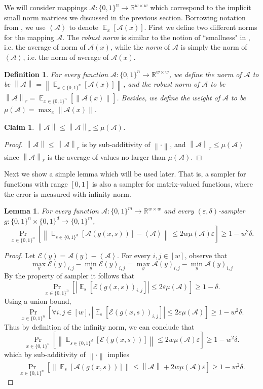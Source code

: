 \documentclass[10pt,a4paper]{article}
\newtheorem{definition}[theorem]{Definition}
\newtheorem{lemma}[theorem]{Lemma}
\newtheorem{claim}[theorem]{Claim}
\DeclareMathOperator*{\Ex}{\mathbb E}
\newcommand{\ex}[2][]{\Ex_{#1}\left[#2\right]}
\newcommand{\pr}[2][]{\Pr_{#1}\left[#2\right]}
\newcommand{\abs}[1]{\left|#1\right|}
\newcommand{\inp}[1]{\left\langle#1\right\rangle}
\newcommand{\norm}[2][]{\left\|#2\right\|_{#1}}
\newcommand{\bbR}{\mathbb R}
\newcommand{\cA}{\mathcal A}
\newcommand{\cE}{\mathcal E}
\newcommand{\bits}[1]{\{0,1\}^{#1}}
\newcommand{\eps}{\varepsilon}
\newcommand{\wt}{\mu}
\newcommand{\ninf}{\norm}
\begin{document}
We will consider mappings $\cA:\bits{n}\to\bbR^{w\times w}$ which correspond to the implicit small norm matrices we discussed in the previous section. Borrowing notation from , we use $\inp{\cA}$ to denote $\ex[x]{\cA(x)}$. First we define two different norms for the mapping $\cA$. The \emph{robust norm} is similar to the notion of ``smallness" in \cite{BCG18}, i.e. the average of norm of $\cA(x)$, while the \emph{norm} of $\cA$ is simply the norm of $\inp{\cA}$, i.e. the norm of average of $\cA(x)$. 
\begin{definition}
For every function $\cA:\bits{n}\to\bbR^{w\times w}$, we define the \emph{norm} of $\cA$ to be $\norm{\cA}=\ninf{\ex[x\in\bits{n}]{\cA(x)}}$, and the \emph{robust norm} of $\cA$ to be  $\norm[r]{\cA}=\ex[x\in\bits{n}]{\ninf{\cA(x)}}$. Besides, we define the weight of $\cA$ to be  $\wt(\cA)=\max_x \ninf{\cA(x)}$.
\end{definition}
\begin{claim}\label{claim:norms}
$\norm{\cA}\le\norm[r]{\cA}\le \wt(\cA)$.
\end{claim}
\begin{proof}
$\norm{\cA}\le\norm[r]{\cA}$ is by sub-additivity of $\norm{\cdot}$, and $\norm[r]{\cA}\le \wt(\cA)$ since $\norm[r]{\cA}$ is the average of values no larger than $\wt(\cA)$.
\end{proof}
\noindent
Next we show a simple lemma which will be used later. That is, a sampler for functions with range $[0,1]$ is also a sampler for matrix-valued functions, where the error is measured with infinity norm. 
\begin{lemma}\label{lemma:mat-samp-general}
For every function $\cA:\bits{m}\to\bbR^{w\times w}$ and every $(\eps,\delta)$-sampler $g:\bits{n}\times\bits{d}\to\bits{m}$,
$$\pr[x\in\bits{n}]{\ninf{\ex[s\in\bits{d}]{\cA(g(x,s))}-\inp{\cA}}\le 2w\wt(\cA)\eps}\ge 1- w^2\delta.$$
\end{lemma}
\begin{proof}
Let $\cE(y)=\cA(y)-\inp{\cA}$. For every $i,j\in[w]$, observe that 
$$\max_y \cE(y)_{i,j}-\min_y \cE(y)_{i,j}= \max_y \cA(y)_{i,j}-\min_y \cA(y)_{i,j}$$ 
By the property of sampler it follows that
$$\pr[x\in\bits{n}]{\abs{\ex[s]{\cE(g(x,s))_{i,j}}}\le 2\eps\wt(\cA)}\ge 1-\delta.$$ Using a union bound, 
$$\pr[x\in\bits{n}]{\forall i,j\in[w], \abs{\ex[s]{\cE(g(x,s))_{i,j}}}\le 2\eps\wt(\cA) }\ge 1- w^2\delta.$$
Thus by definition of the infinity norm, we can conclude that 
$$\pr[x\in\bits{n}]{\ninf{\ex[s\in\bits{d}]{\cE(g(x,s))}}\le 2w\wt(\cA)\eps }\ge 1-w^2\delta.$$
which by sub-additivity of $\ninf{\cdot}$ implies 
$$\pr[x\in\bits{n}]{\ninf{\ex[s]{\cA(g(x,s))}}\le \norm{\cA}+2w\wt(\cA)\eps}\ge 1- w^2\delta.$$
\end{proof}
\end{document}

